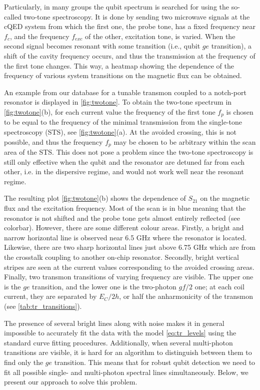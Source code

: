 \documentclass[%
 aip,
 amsmath,amssymb,
 reprint,%
]{revtex4-1}
\begin{document}
Particularly, in many groups the qubit spectrum is searched for using the so-called two-tone spectroscopy\cite{wallraff2007}. It is done by sending two microwave signals at the cQED system from which the first one, the probe tone, has a fixed frequency near $f_c$, and the frequency $f_{exc}$ of the other, excitation tone,  is varied. When the second signal becomes resonant with some transition (i.e., qubit $ge$ transition), a shift of the cavity frequency occurs, and thus the transmission at the frequency of the first tone changes. This way, a heatmap showing the dependence of the frequency of various system transitions on the magnetic flux can be obtained. 

An example from our database for a tunable transmon coupled to a notch-port resonator is displayed in \autoref{fig:twotone}. To obtain the two-tone spectrum in \autoref{fig:twotone}(b), for each current value the frequency of the first tone $f_p$ is chosen to be equal to the frequency of the minimal transmission from the single-tone spectroscopy (STS), see \autoref{fig:twotone}(a). At the avoided crossing, this is not possible, and thus the frequency $f_p$ may be chosen to be arbitrary within the scan area of the STS. This does not pose a problem since the two-tone spectroscopy is still only effective when the qubit and the resonator are detuned far from each other, i.e. in the dispersive regime\cite{blais2004}, and would not work well near the resonant regime.

The resulting plot \autoref{fig:twotone}(b) shows the dependence of $S_{21}$ on the magnetic flux and the excitation frequency. Most of the scan is in blue meaning that the resonator is not shifted and the probe tone gets almost entirely reflected (see colorbar). However, there are some different colour areas. Firstly, a bright and narrow horizontal line is observed near 6.5 GHz where the resonator is located. Likewise, there are two sharp horizontal lines just above 6.75 GHz which are from the crosstalk coupling to another on-chip resonator. Secondly, bright vertical stripes are seen at the current values corresponding to the avoided crossing areas. Finally, two transmon transitions of varying frequency are visible. The upper one is the $ge$ transition, and the lower one is the two-photon $gf/2$ one; at each coil current, they are separated by $E_C/2h$, or half the anharmonicity of the transmon (see \autoref{tab:tr_transitions}).

The presence of several bright lines along with noise makes it in general impossible to accurately fit the data with the model \eqref{eq:tr_levels} using the standard curve fitting procedures. Additionally, when several multi-photon transitions are visible, it is hard for an algorithm to distinguish between them to find only the $ge$ transition. This means that for robust qubit detection we need to fit all possible single- and multi-photon spectral lines simultaneously. Below, we present our approach to solve this problem.
\end{document}
